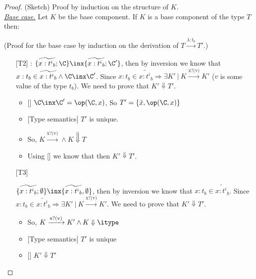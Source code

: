 \begin{proof} (Sketch) Proof by induction on the structure of $K$.\\

\underline{\textit{Base case.}} Let $K$ be the base component.
If $K$ is a base component of the type $T$ then:

(Proof for the base case by induction on the derivation of $T\xrightarrow{\text{$\lambda:t_b$}}T'$.)


\begin{itemize}
    \item [{[T2]}]: $\{\widetilde{x:{t^i}_b};\C\}\inx \{\widetilde{x:{t^i}_b};\C'\}$, then by inversion we know that $x:t_b\in \widetilde{x:{t^i}_b} \wedge \C\inx \C'$. Since $x:t_b\in \widetilde{x:{t^i}_b}\Rightarrow \exists K' \ |\ K\xrightarrow{\text{x?(v)}}K'$ ($v$ is some value of the type $t_b$).  We need to prove that $K'\Downarrow T'$.
    
    \begin{itemize}
        \item {[]} $\C\inx \C'=\op(\C,x)$, So $T'=\{\tilde{x},\op(\C,x)\}$ 
        
        \item {[Type semantics]} $T'$ is unique.
        
        \item So, $K\xrightarrow{\text{x?(v)}} \wedge K\Downarrow T$
        
            \item Using [] we know that then $K'\Downarrow T'$.
    \end{itemize}
    \end{itemize}
    
    
  \begin{itemize}
\item [{[T3]}]

$\{\widetilde{x:{t^i}_b};\emptyset\}\inx \{\widetilde{x:{t^i}_b},\emptyset\}$, then by inversion we know that $x:t_b\in \widetilde{x:{t^i}_b} $. Since $x:t_b\in \widetilde{x:{t^i}_b}\Rightarrow \exists K' \ |\ K\xrightarrow{\text{x?(v)}}K'$. We need to prove that $K'\Downarrow T'$.\\

\begin{itemize}
 
    
    \item So, $K\xrightarrow{\text{x?(v)}}K' \wedge K\Downarrow \itype$
    \item {[Type semantics]} $T'$ is unique
    \item {[}] $K'\Downarrow T'$
    

\end{itemize}
\end{itemize}
\end{proof}
